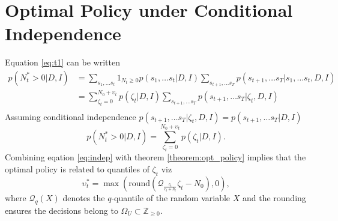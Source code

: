 \documentclass[a4paper,12pt]{article}
\begin{document}
	
	\section{Optimal Policy under Conditional Independence}
	Equation \eqref{eq:t1} can be written
	\begin{equation}
		\begin{split}
			p(N_t^* > 0 | D, I) &= \sum_{s_1,\dots s_t}1_{N_{t}\geq 0}p(s_1,\dots s_t|D,I)\sum_{s_{t+1},\dots s_T}p(s_{t+1},\dots s_T|s_1,\dots s_t,D,I)\\
			& = \sum_{\zeta_t=0}^{N_0+\upsilon_t}p(\zeta_t|D,I)\sum_{s_{t+1},\dots s_T}p(s_{t+1},\dots s_T|\zeta_t,D,I)\\
		\end{split}
	\end{equation}
	Assuming conditional independence $p(s_{t+1},\dots s_T|\zeta_t,D,I)=p(s_{t+1},\dots s_T|D,I)$
	\begin{equation}
			p(N_t^* > 0 | D, I)  = \sum_{\zeta_t=0}^{N_0+\upsilon_t}p(\zeta_t|D,I).
			\label{eq:indep}
	\end{equation}
	Combining eqation \eqref{eq:indep} with theorem \ref{theorem:opt_policy} implies that the optimal policy is related to quantiles of $\zeta_t$ viz
	\begin{equation}
		\upsilon_t^* = \max(\text{round}(\mathcal{Q}_{\frac{c_t}{c_t+h_t}}\zeta_t-N_0),0),
		\label{eq:opt}
	\end{equation}
	where $\mathcal{Q}_q(X)$ denotes the $q$-quantile of the random variable $X$ and the rounding ensures the decisions belong to $\Omega_U\subset \mathbb{Z}_{\geq 0}$. 
	
\end{document}
